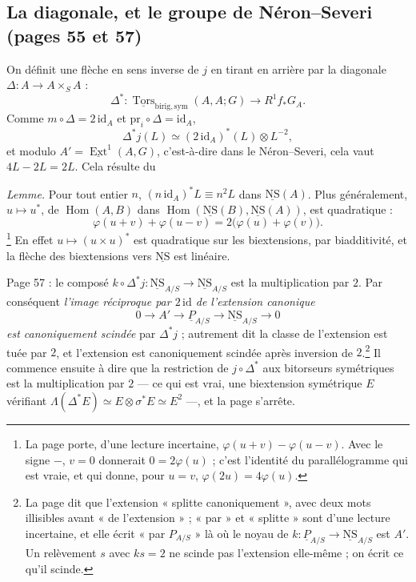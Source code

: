 \documentclass[11pt,a4paper]{article}
\begin{document}
\subsection*{La diagonale, et le groupe de Néron--Severi (pages 55 et 57)}

On définit une flèche en sens inverse de $j$ en tirant en arrière par la
diagonale $\Delta\colon A \to A \times_S A$ :
\[ \Delta^*\colon \underline{\operatorname{Tors}}_{\mathrm{birig,sym}}(A, A; G) \to
R^1f_*G_A . \]
Comme $m \circ \Delta = 2\,\mathrm{id}_A$ et $\mathrm{pr}_i \circ \Delta =
\mathrm{id}_A$,
\[ \Delta^* j(L) \simeq (2\,\mathrm{id}_A)^*(L) \otimes L^{-2} , \]
et modulo $A' = \underline{\operatorname{Ext}}^1(A, G)$, c'est-à-dire dans le
Néron--Severi, cela vaut $4L - 2L = 2L$. Cela résulte du

\emph{Lemme.} Pour tout entier $n$, $(n\,\mathrm{id}_A)^*L \equiv n^2L$ dans
$\underline{\mathrm{NS}}(A)$. Plus généralement, $u \mapsto u^*$, de
$\operatorname{Hom}(A, B)$ dans $\operatorname{Hom}(\underline{\mathrm{NS}}(B),
\underline{\mathrm{NS}}(A))$, est quadratique :
\[ \varphi(u+v) + \varphi(u-v) = 2\bigl(\varphi(u) + \varphi(v)\bigr) .
\]
\footnote{La page porte, d'une lecture incertaine, $\varphi(u+v) - \varphi(u-v)$.
Avec le signe $-$, $v = 0$ donnerait $0 = 2\varphi(u)$ ; c'est l'identité du
parallélogramme qui est vraie, et qui donne, pour $u = v$, $\varphi(2u) =
4\varphi(u)$.} En effet $u \mapsto (u \times u)^*$ est quadratique sur les
biextensions, par biadditivité, et la flèche des biextensions vers
$\underline{\mathrm{NS}}$ est linéaire.

Page 57 : le composé $k \circ \Delta^* j\colon \underline{\mathrm{NS}}_{A/S} \to
\underline{\mathrm{NS}}_{A/S}$ est la multiplication par $2$. Par conséquent
\emph{l'image réciproque par $2\,\mathrm{id}$ de l'extension canonique}
\[ 0 \to A' \to \underline{P}_{A/S} \to \underline{\mathrm{NS}}_{A/S} \to 0 \]
\emph{est canoniquement scindée} par $\Delta^* j$ ; autrement dit la classe de
l'extension est tuée par $2$, et l'extension est canoniquement scindée après
inversion de $2$.\footnote{La page dit que l'extension « splitte canoniquement »,
avec deux mots illisibles avant « de l'extension » ; « par » et « splitte » sont
d'une lecture incertaine, et elle écrit « par $P_{A/S}$ » là où le noyau de
$k\colon \underline{P}_{A/S} \to \underline{\mathrm{NS}}_{A/S}$ est $A'$. Un
relèvement $s$ avec $ks = 2$ ne scinde pas l'extension elle-même ; on écrit ce
qu'il scinde.} Il commence ensuite à dire que la restriction de $j \circ \Delta^*$
aux bitorseurs symétriques est la multiplication par $2$ --- ce qui est vrai, une
biextension symétrique $E$ vérifiant $\Lambda(\Delta^*E) \simeq E \otimes
\sigma^*E \simeq E^2$ ---, et la page s'arrête.
\end{document}

